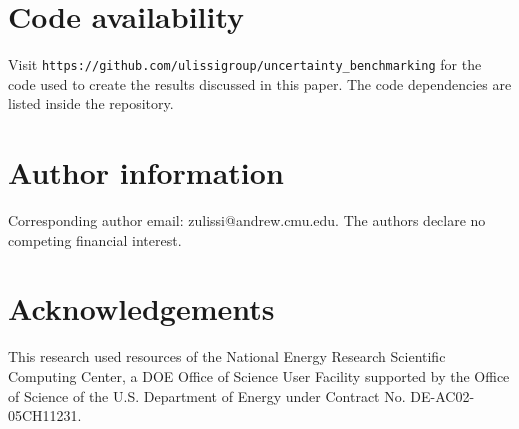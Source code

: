 \documentclass[]{achemso}
\begin{document}

\section*{Code availability} Visit \texttt{https://github.com/ulissigroup/uncertainty\_benchmarking} for the code used to create the results discussed in this paper.
The code dependencies are listed inside the repository.

\section*{Author information} Corresponding author email:  zulissi@andrew.cmu.edu.
The authors declare no competing financial interest.

\section*{Acknowledgements} This research used resources of the National Energy Research Scientific Computing Center, a DOE Office of Science User Facility supported by the Office of Science of the U.S. Department of Energy under Contract No. DE-AC02-05CH11231. %



\clearpage

\end{document}
